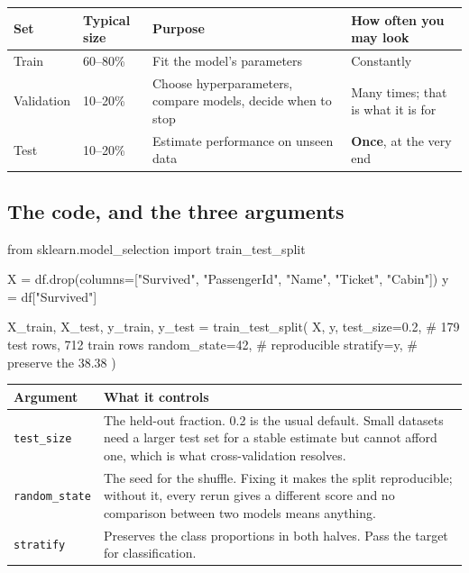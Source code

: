 \documentclass[11pt,a4paper]{article}
\begin{document}
\begin{tabularx}{\textwidth}{@{}l l X X@{}}
\toprule
\rowcolor{tablehead} \textbf{Set} & \textbf{Typical size} & \textbf{Purpose} & \textbf{How often you may look} \\
\midrule
Train & 60--80\% & Fit the model's parameters & Constantly \\
Validation & 10--20\% & Choose hyperparameters, compare models, decide when to stop & Many times; that is what it is for \\
Test & 10--20\% & Estimate performance on unseen data & \textbf{Once}, at the very end \\
\bottomrule
\end{tabularx}


\subsection{The code, and the three arguments}

\begin{py}
from sklearn.model_selection import train_test_split

X = df.drop(columns=["Survived", "PassengerId", "Name", "Ticket", "Cabin"])
y = df["Survived"]

X_train, X_test, y_train, y_test = train_test_split(
    X, y,
    test_size=0.2,          # 179 test rows, 712 train rows
    random_state=42,        # reproducible
    stratify=y,             # preserve the 38.38%
)
\end{py}

\begin{tabularx}{\textwidth}{@{}l X@{}}
\toprule
\rowcolor{tablehead} \textbf{Argument} & \textbf{What it controls} \\
\midrule
\lstinline|test_size| & The held-out fraction. 0.2 is the usual default. Small datasets need a larger test set for a stable estimate but cannot afford one, which is what cross-validation resolves. \\
\lstinline|random_state| & The seed for the shuffle. Fixing it makes the split reproducible; without it, every rerun gives a different score and no comparison between two models means anything. \\
\lstinline|stratify| & Preserves the class proportions in both halves. Pass the target for classification. \\
\bottomrule
\end{tabularx}
\end{document}
